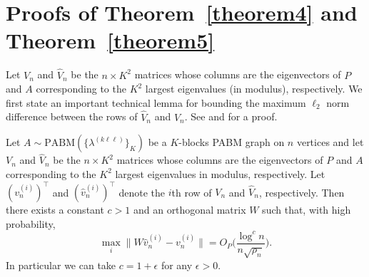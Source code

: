 \documentclass[12pt]{article}
\begin{document}
\hypertarget{proofs}{%
\section{Proofs of Theorem~\ref{theorem4} and Theorem~\ref{theorem5}}}
Let \(V_n\) and \(\hat{V}_n\)
be the $n \times K^2$ matrices whose columns are the eigenvectors of \(P\) and \(A\) corresponding to the
$K^2$ largest eigenvalues (in modulus), respectively. 
We first state an important technical lemma for bounding the maximum
$\ell_2$ norm difference between the rows of $\hat{V}_n$ and
$V_n$. See \cite{cape_biometrika} and 
\cite[Lemma~5]{rubindelanchy2017statistical} for a proof. 
\begin{lemma}
  \label{lem:technical}
Let $A \sim \mathrm{PABM}(\{\lambda^{(k \ell \ell)}\}_{K})$ be a $K$-blocks
PABM graph on $n$ vertices and let \(V_n\) and \(\hat{V}_n\)
be the $n \times K^2$ matrices whose columns are the eigenvectors of \(P\) and \(A\) corresponding to the
$K^2$ largest eigenvalues in modulus, respectively.
Let \((v_n^{(i)})^\top\) and \((\hat{v}_n^{(i)})^\top\) denote the $i$th 
row of \(V_n\) and \(\hat{V}_n\), respectively. 
Then there exists a constant $c > 1$ and an orthogonal matrix $W$ such
that, with high probability,
$$\max_{i} \|W \hat{v}_n^{(i)} - v_n^{(i)}\|  = O_P \Big(\frac{\log^{c}n}{n \sqrt{\rho_n}} \Big).$$
In particular we can take $c = 1 + \epsilon$ for any $\epsilon > 0$. 
\end{lemma}


%
\end{document}
